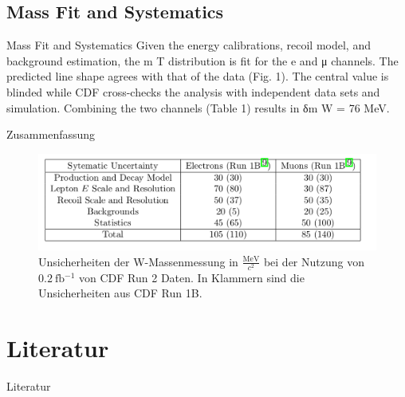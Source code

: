 \documentclass[aspectratio=1610, 9pt]{beamer}
\begin{document}
\subsection{Mass Fit and Systematics}

\begin{frame}{Mass Fit and Systematics}
  Given the energy calibrations, recoil model, and background estimation, the m T distribution is
 fit for the e and μ channels. The predicted line shape agrees with that of the data (Fig. 1).
 The central value is blinded while CDF cross-checks the analysis with independent data sets
 and simulation. Combining the two channels (Table 1) results in δm W = 76 MeV.
\end{frame}

\begin{frame}{Zusammenfassung}
  \begin{figure}
    \includegraphics[width=\textwidth]{images/unsicherheiten.png}
    \caption{Unsicherheiten der W-Massenmessung in $\frac{\si{\MeV}}{c^2}$ bei der Nutzung von $\SI{0,2}{\femto \barn^{-1}}$ von CDF Run 2 Daten. In Klammern sind die Unsicherheiten aus CDF Run 1B.}
  \end{figure}
\end{frame}





%

\section{Literatur}
\begin{frame}[allowframebreaks]{Literatur}
  \printbibliography
\end{frame}
\end{document}

